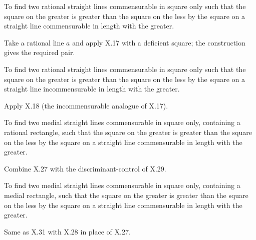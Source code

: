 \begin{claim}
\label{prop:X.29}
To find two rational straight lines commensurable in square only such
that the square on the greater is greater than the square on the
less by the square on a straight line commensurable in length with
the greater.
\end{claim}
\begin{evidence}[Proof of X.29]
\label{ev:X.29}
Take a rational line $a$ and apply X.17 with a deficient square; the
construction gives the required pair.
\end{evidence}

\begin{claim}
\label{prop:X.30}
To find two rational straight lines commensurable in square only such
that the square on the greater is greater than the square on the
less by the square on a straight line incommensurable in length with
the greater.
\end{claim}
\begin{evidence}[Proof of X.30]
\label{ev:X.30}
Apply X.18 (the incommensurable analogue of X.17).
\end{evidence}

\begin{claim}
\label{prop:X.31}
To find two medial straight lines commensurable in square only,
containing a rational rectangle, such that the square on the greater
is greater than the square on the less by the square on a straight
line commensurable in length with the greater.
\end{claim}
\begin{evidence}[Proof of X.31]
\label{ev:X.31}
Combine X.27 with the discriminant-control of X.29.
\end{evidence}

\begin{claim}
\label{prop:X.32}
To find two medial straight lines commensurable in square only,
containing a medial rectangle, such that the square on the greater
is greater than the square on the less by the square on a straight
line commensurable in length with the greater.
\end{claim}
\begin{evidence}[Proof of X.32]
\label{ev:X.32}
Same as X.31 with X.28 in place of X.27.
\end{evidence}

